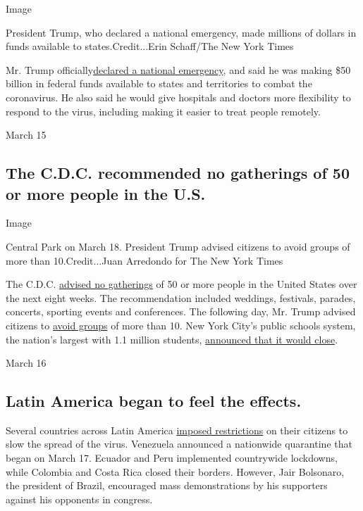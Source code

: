 Image

President Trump, who declared a national emergency, made millions of
dollars in funds available to states.Credit...Erin Schaff/The New York
Times

Mr. Trump
officially\href{https://www.nytimes3xbfgragh.onion/2020/03/13/world/coronavirus-news-live-updates.html\#link-37509802}{declared
a national emergency}, and said he was making \$50 billion in federal
funds available to states and territories to combat the coronavirus. He
also said he would give hospitals and doctors more flexibility to
respond to the virus, including making it easier to treat people
remotely.

March 15

\hypertarget{the-cdc-recommended-no-gatherings-of-50-or-more-people-in-the-us}{%
\subsection{The C.D.C. recommended no gatherings of 50 or more people in
the
U.S.}\label{the-cdc-recommended-no-gatherings-of-50-or-more-people-in-the-us}}

Image

Central Park on March 18. President Trump advised citizens to avoid
groups of more than 10.Credit...Juan Arredondo for The New York Times

The C.D.C.
\href{https://www.nytimes3xbfgragh.onion/2020/03/15/world/coronavirus-live.html}{advised
no gatherings} of 50 or more people in the United States over the next
eight weeks. The recommendation included weddings, festivals, parades,
concerts, sporting events and conferences. The following day, Mr. Trump
advised citizens to
\href{https://www.nytimes3xbfgragh.onion/2020/03/16/world/live-coronavirus-news-updates.html}{avoid
groups} of more than 10. New York City's public schools system, the
nation's largest with 1.1 million students,
\href{https://www.nytimes3xbfgragh.onion/2020/03/15/nyregion/nyc-schools-closed.html}{announced
that it would close}.

March 16

\hypertarget{latin-america-began-to-feel-the-effects}{%
\subsection{Latin America began to feel the
effects.}\label{latin-america-began-to-feel-the-effects}}

Several countries across Latin America
\href{https://www.nytimes3xbfgragh.onion/2020/03/16/world/live-coronavirus-news-updates.html}{imposed
restrictions} on their citizens to slow the spread of the virus.
Venezuela announced a nationwide quarantine that began on March 17.
Ecuador and Peru implemented countrywide lockdowns, while Colombia and
Costa Rica closed their borders. However, Jair Bolsonaro, the president
of Brazil, encouraged mass demonstrations by his supporters against his
opponents in congress.

